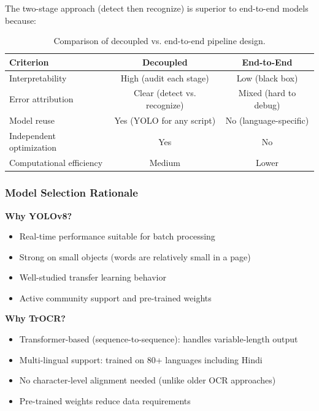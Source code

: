 \documentclass[14pt,a4paper]{article}
\begin{document}
The two-stage approach (detect then recognize) is superior to end-to-end models because:

\begin{table}[h]
    \centering
    \begin{tabular}{lcc}
        \toprule
        \textbf{Criterion} & \textbf{Decoupled} & \textbf{End-to-End} \\
        \midrule
        Interpretability & High (audit each stage) & Low (black box) \\
        Error attribution & Clear (detect vs. recognize) & Mixed (hard to debug) \\
        Model reuse & Yes (YOLO for any script) & No (language-specific) \\
        Independent optimization & Yes & No \\
        Computational efficiency & Medium & Lower \\
        \bottomrule
    \end{tabular}
    \caption{Comparison of decoupled vs. end-to-end pipeline design.}
\end{table}

\subsubsection{Model Selection Rationale}

\textbf{Why YOLOv8?}
\begin{itemize}
    \item Real-time performance suitable for batch processing
    \item Strong on small objects (words are relatively small in a page)
    \item Well-studied transfer learning behavior
    \item Active community support and pre-trained weights
\end{itemize}

\textbf{Why TrOCR?}
\begin{itemize}
    \item Transformer-based (sequence-to-sequence): handles variable-length output
    \item Multi-lingual support: trained on 80+ languages including Hindi
    \item No character-level alignment needed (unlike older OCR approaches)
    \item Pre-trained weights reduce data requirements
\end{itemize}
\newpage
\end{document}
